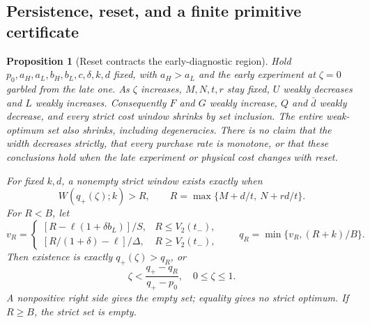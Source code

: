 \documentclass[11pt]{article}
\newtheorem{proposition}{Proposition}
\begin{document}
\subsection{Persistence, reset, and a finite primitive certificate}\label{sec:resetregions}
\begin{proposition}[Reset contracts the early-diagnostic region]\label{prop:resetregion}
Hold $p_0,a_H,a_L,b_H,b_L,c,\delta,k,d$ fixed, with $a_H>a_L$ and the early experiment at $\zeta=0$ garbled from the late one. As $\zeta$ increases, $M,N,t,r$ stay fixed, $U$ weakly decreases and $L$ weakly increases. Consequently $F$ and $G$ weakly increase, $Q$ and $\bar d$ weakly decrease, and every strict cost window shrinks by set inclusion. The entire weak-optimum set also shrinks, including degeneracies. There is no claim that the width decreases strictly, that every purchase rate is monotone, or that these conclusions hold when the late experiment or physical cost changes with reset.

For fixed $k,d$, a nonempty strict window exists exactly when
\begin{equation}
 W(q_+(\zeta);k)>R,\qquad
 R=\max\{M+d/t,\ N+rd/t\}.\label{eq:Rreset}
\end{equation}
For $R<B$, let
\begin{equation}
 v_R=\begin{cases}
 [R-\ell(1+\delta b_L)]/S,&R\leq V_2(t_-),\\
 [R/(1+\delta)-\ell]/\Delta,&R\geq V_2(t_-),
 \end{cases}\qquad q_R=\min\{v_R,(R+k)/B\}.\label{eq:inverse}
\end{equation}
Then existence is exactly $q_+(\zeta)>q_R$, or
\begin{equation}
 \zeta<\frac{q_+-q_R}{q_+-p_0},\quad 0\leq\zeta\leq1.\label{eq:zetacrit}
\end{equation}
A nonpositive right side gives the empty set; equality gives no strict optimum. If $R\geq B$, the strict set is empty.
\end{proposition}
\end{document}

